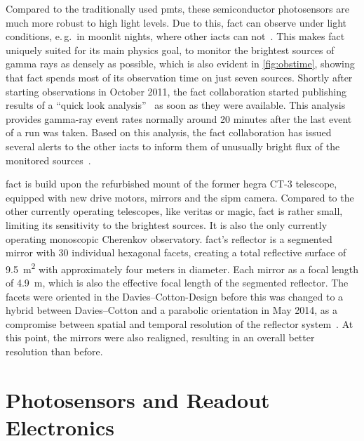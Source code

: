 Compared to the traditionally used \glspl{pmt},
these semiconductor photosensors are much more robust to high light levels.
Due to this, \gls{fact} can observe under light conditions,
e.\,g.\ in moonlit nights, where other \glspl{iact} can not~\cite{fact_full_moon}.
This makes \gls{fact} uniquely suited for its main physics goal,
to monitor the brightest sources of gamma rays as densely as possible,
which is also evident in \autoref{fig:obstime},
showing that \gls{fact} spends most of its observation time on just seven sources.
Shortly after starting observations in October 2011,
the \gls{fact} collaboration started publishing
results of a \enquote{quick look analysis}~\cite{qla} as soon as they were available.
This analysis provides gamma-ray event rates normally around 20 minutes after the last event of a run was taken.
Based on this analysis, the \gls{fact} collaboration has issued
several alerts to the other \glspl{iact} to inform them of unusually bright
flux of the monitored sources~\cite{fact_alerts}.

\gls{fact} is build upon the refurbished mount of the former \gls{hegra} CT-3 telescope,
equipped with new drive motors, mirrors and the \gls{sipm} camera.
Compared to the other currently operating telescopes, like \gls{veritas} or \gls{magic},
\gls{fact} is rather small, limiting its sensitivity to the brightest sources.
It is also the only currently operating monoscopic Cherenkov observatory.
\gls{fact}'s reflector is a segmented mirror with 30 individual hexagonal facets,
creating a total reflective surface of \SI{9.5}{\square\meter} with approximately four
meters in diameter.
Each mirror as a focal length of \SI{4.9}{\meter}, which is also the effective focal 
length of the segmented reflector.
The facets were oriented in the Davies--Cotton-Design\cite{davies-cotton} before this
was changed to a hybrid between Davies--Cotton and a parabolic orientation
in May 2014, as a compromise between spatial and temporal resolution of the reflector system~\cite{mirror-alignment}.
At this point, the mirrors were also realigned, resulting in an overall better resolution
than before.

\section{Photosensors and Readout Electronics}\label{sec:camera}

